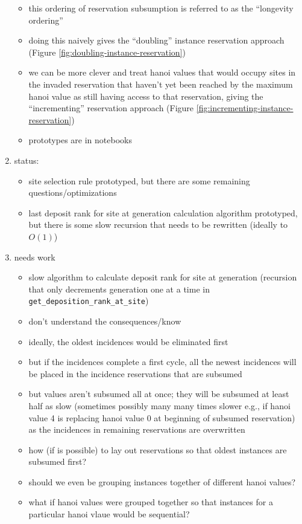 \begin{enumerate}
\begin{itemize}
  \item this ordering of reservation subsumption is referred to as the ``longevity ordering''
  \item doing this naively gives the ``doubling'' instance reservation approach (Figure \ref{fig:doubling-instance-reservation})
  \item we can be more clever and treat hanoi values that would occupy sites in the invaded reservation that haven't yet been reached by the maximum hanoi value as still having access to that reservation, giving the ``incrementing'' reservation approach (Figure \ref{fig:incrementing-instance-reservation})
  \item prototypes are in notebooks
\end{itemize}
\item status:
\begin{itemize}
  \item site selection rule prototyped, but there are some remaining questions/optimizations
  \item last deposit rank for site at generation calculation algorithm prototyped, but there is some slow recursion that needs to be rewritten (ideally to $O(1)$)
\end{itemize}
\item needs work
\begin{itemize}
  \item slow algorithm to calculate deposit rank for site at generation (recursion that only decrements generation one at a time in \texttt{get\_deposition\_rank\_at\_site})
  \item don't understand the consequences/know
  \item ideally, the oldest incidences would be eliminated first
  \item but if the incidences complete a first cycle, all the newest incidences will be placed in the incidence reservations that are subsumed
  \item but values aren't subsumed all at once; they will be subsumed at least half as slow (sometimes possibly many many times slower e.g., if hanoi value 4 is replacing hanoi value 0 at beginning of subsumed reservation) as the incidences in remaining reservations are overwritten
  \item how (if is possible) to lay out reservations so that oldest instances are subsumed first?
  \item should we even be grouping instances together of different hanoi values?
  \item what if hanoi values were grouped together so that instances for a particular hanoi vlaue would be sequential?
\end{itemize}
\end{enumerate}
